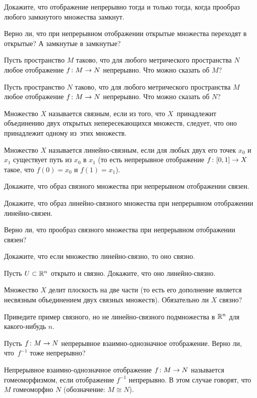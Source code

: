 \documentclass[a4paper,12pt]{article}
\begin{document}
Докажите, что отображение непрерывно тогда и только тогда, когда прообраз любого замкнутого множества замкнут.

Верно ли, что при непрерывном отображении открытые множества переходят в открытые? А замкнутые в замкнутые?

Пусть пространство $M$ таково, что для любого метрического пространства $N$ любое отображение $f \colon M \rightarrow N$ непрерывно. Что можно сказать об $M$?

Пусть пространство $N$ таково, что для любого метрического пространства $M$ любое отображение $f \colon M \rightarrow N$ непрерывно. Что можно сказать об $N$?

\newpage

Множество $X$ называется  связным, если из того, что $X$~принадлежит объединению двух открытых непересекающихся множеств, следует, что оно принадлежит одному из~этих множеств.

Множество $X$ называется  линейно-связным, если для любых двух его точек $x_0$ и $x_1$ существует путь из $x_0$ в $x_1$ (то есть непрерывное отображение $f \colon [0, 1] \rightarrow X$ такое, что $f(0) = x_0$ и $f(1) = x_1$).

Докажите, что образ связного множества при непрерывном отображении связен.

Докажите, что образ линейно-связного множества при непрерывном отображении линейно-связен.

Верно ли, что прообраз связного множества при непрерывном отображении связен?

Докажите, что если множество линейно-связно, то оно связно.

Пусть $U \subset \mathbb{R}^n$ открыто и связно. Докажите, что оно линейно-связно.

Множество $X$ делит плоскость на две части (то есть его дополнение является несвязным объединением двух связных множеств). Обязательно ли $X$ связно?

Приведите пример связного, но не линейно-связного подмножества в $\mathbb{R}^n$ для какого-нибудь $n$.

Пусть $f \colon M \rightarrow N$ непрерывное взаимно-однозначное отображение. Верно ли, что~$f^{-1}$ тоже непрерывно?

Непрерывное взаимно-однозначное отображение $f \colon M \rightarrow N$ называется  гомеоморфизмом, если отображение $f^{-1}$ непрерывно. В этом случае говорят, что $M$  гомеоморфно $N$ (обозначение: $M \cong N$).
\end{document}
